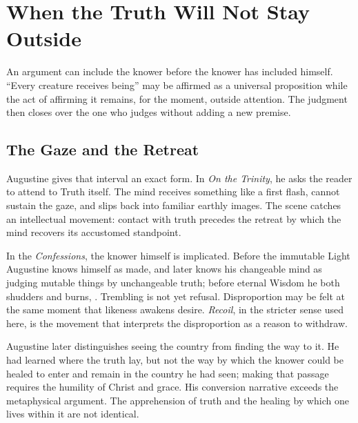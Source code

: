 \section{When the Truth Will Not Stay Outside}

An argument can include the knower before the knower has included himself. ``Every creature receives being'' may be affirmed as a universal proposition while the act of affirming it remains, for the moment, outside attention. The judgment then closes over the one who judges without adding a new premise.

\subsection{The Gaze and the Retreat}

Augustine gives that interval an exact form. In \emph{On the Trinity}, he asks the reader to attend to Truth itself. The mind receives something like a first flash, cannot sustain the gaze, and slips back into familiar earthly images. The scene catches an intellectual movement: contact with truth precedes the retreat by which the mind recovers its accustomed standpoint.

In the \emph{Confessions}, the knower himself is implicated. Before the immutable Light Augustine knows himself as made, and later knows his changeable mind as judging mutable things by unchangeable truth; before eternal Wisdom he both shudders and burns, . Trembling is not yet refusal. Disproportion may be felt at the same moment that likeness awakens desire. \emph{Recoil}, in the stricter sense used here, is the movement that interprets the disproportion as a reason to withdraw.

Augustine later distinguishes seeing the country from finding the way to it. He had learned where the truth lay, but not the way by which the knower could be healed to enter and remain in the country he had seen; making that passage requires the humility of Christ and grace. His conversion narrative exceeds the metaphysical argument. The apprehension of truth and the healing by which one lives within it are not identical.


